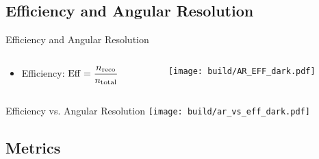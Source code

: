\subsection{Efficiency and Angular Resolution}%
\label{sub:Efficiency_AR}

\begin{frame}{Efficiency and Angular Resolution}
    \begin{columns}
        \begin{column}{0.28\textwidth}
            \begin{itemize}
                \item [\rightarrow] Efficiency: \hspace{0.5cm} \(\displaystyle \operatorname{Eff} = \frac{n_\text{reco}}{n_\text{total}}\)
            \end{itemize}
        \end{column}
        \begin{column}{0.68\textwidth}
            \centering
            \texttt{[image: build/AR\_EFF\_dark.pdf]}
        \end{column}
    \end{columns}

\end{frame}

\begin{frame}{Efficiency vs. Angular Resolution}
    \centering
    \texttt{[image: build/ar\_vs\_eff\_dark.pdf]}
\end{frame}

\subsection{Metrics}%
\label{sub:Metrics}

